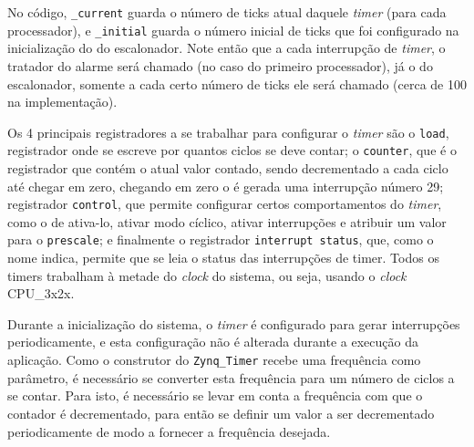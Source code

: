 No código, \verb+_current+ guarda o número de ticks atual daquele \emph{timer} (para cada processador), e \verb+_initial+ guarda o número inicial de ticks que foi configurado na inicialização do do escalonador. Note então que a cada interrupção de \emph{timer}, o tratador do alarme será chamado (no caso do primeiro processador), já o do escalonador, somente a cada certo número de ticks ele será chamado (cerca de 100 na implementação).

Os 4 principais registradores a se trabalhar para configurar o \emph{timer} são o \verb+load+, registrador onde se escreve por quantos ciclos se deve contar; o \verb+counter+, que é o registrador que contém o atual valor contado, sendo decrementado a cada ciclo até chegar em zero, chegando em zero o é gerada uma interrupção número 29; registrador \verb+control+, que permite configurar certos comportamentos do \emph{timer}, como o de ativa-lo, ativar modo cíclico, ativar interrupções e atribuir um valor para o \verb+prescale+; e finalmente o registrador \verb+interrupt status+, que, como o nome indica, permite que se leia o status das interrupções de timer. Todos os timers trabalham à metade do \emph{clock} do sistema, ou seja, usando o \emph{clock} CPU\_3x2x.

Durante a inicialização do sistema, o \emph{timer} é configurado para gerar interrupções periodicamente, e esta configuração não é alterada durante a execução da aplicação. Como o construtor do \verb+Zynq_Timer+ recebe uma frequência como parâmetro, é necessário se converter esta frequência para um número de ciclos a se contar. Para isto, é necessário se levar em conta a frequência com que o contador é decrementado, para então se definir um valor a ser decrementado periodicamente de modo a fornecer a frequência desejada.

